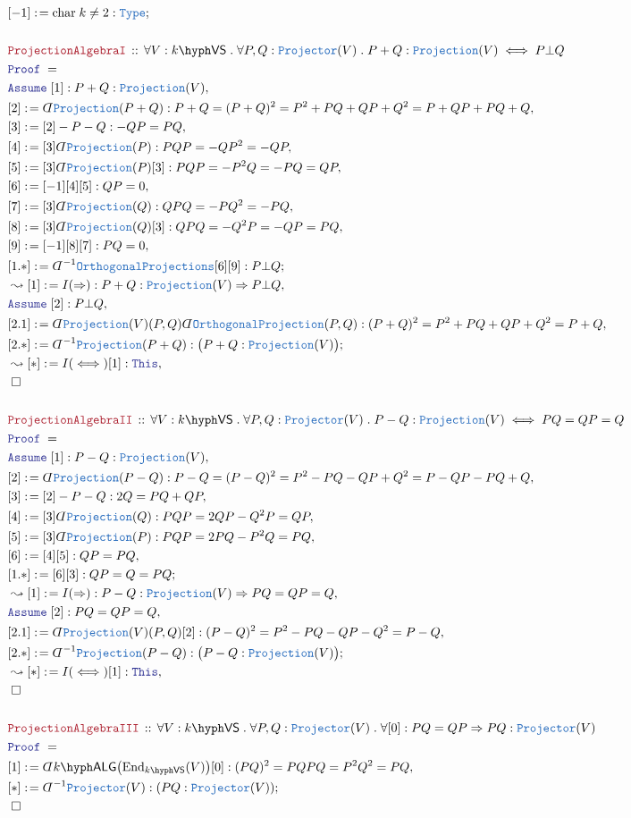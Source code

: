\documentclass[12pt]{scrartcl}%
\newcommand{\TYPE}[1]{\textcolor{NavyBlue}{\mathtt{#1}}}%
\newcommand{\LOGIC}[1]{\textcolor{Blue}{\mathtt{#1}}}%
\newcommand{\THM}[1]{\textcolor{Maroon}{\mathtt{#1}}}%
\renewcommand{\.}{\; . \;} %
\newcommand{\de}{: \kern 0.1pc =} %
\newcommand{\Theorem}[2]{& \THM{#1} \, :: \, #2 \\ & \Proof = \\ } %
\newcommand{\Page}[1]{ \begin{align*} #1 \end{align*}  }%
\newcommand{ \bd }{ \ByDef }%
\newcommand{\Type}{\TYPE{Type}}%
\newcommand{\End}{\mathrm{End}}%
\newcommand{\Say}[3]{& #1 \de #2 : #3, \\} %
\newcommand{\Conclude}[3]{& #1 \de #2 : #3; \\}%
\newcommand{\Derive}[3]{& \leadsto #1 \de #2 : #3, \\} %
\newcommand{\Assume}[2]{& \LOGIC{Assume} \; #1 : #2, \\} %
\newcommand{\QED}{\; \square} %
\newcommand{\EndProof}{& \QED \\} %
\newcommand{\ByDef}{\rotatebox[origin=c]{-180}{$D$}}%
\newcommand{\Proof}{\LOGIC{Proof} \; } %
\newcommand{\VS}[1]{#1\hyph\mathsf{VS}} %
\newcommand{\LALG}[1]{#1\hyph\mathsf{ALG}}%
\begin{document}
\Page{
	\Conclude{[-1]}{\mathrm{char} \; k \neq 2}{\Type}
	\\
	\Theorem{ProjectionAlgebraI}{\forall V : \VS{k} \. \forall P,Q : \TYPE{Projector}(V) \. P + Q : \TYPE{Projection}(V) \iff P \bot Q}
	\Assume{[1]}{P + Q : \TYPE{Projection}(V)}
	\Say{[2]}{\bd \TYPE{Projection}(P + Q)}{ P + Q = (P + Q)^2 = P^2 + PQ + QP + Q^2 = P + QP +PQ + Q}
	\Say{[3]}{ [2] - P - Q}{ -QP = PQ }
	\Say{[4]}{[3]\bd \TYPE{Projection}(P)}{ PQP = - QP^2 = - QP  }
	\Say{[5]}{[3]\bd \TYPE{Projection}(P)[3] }{ PQP = - P^2Q = - PQ = QP }
	\Say{[6]}{[-1][4][5]}{QP = 0}
	\Say{[7]}{[3]\bd \TYPE{Projection}(Q)}{ QPQ = - PQ^2 = - PQ  }
	\Say{[8]}{[3]\bd \TYPE{Projection}(Q)[3] }{ QPQ = - Q^2P = - QP = PQ }
	\Say{[9]}{[-1][8][7]}{PQ = 0}
	\Conclude{[1.*]}{\bd^{-1}\TYPE{OrthogonalProjections}[6][9]}{P \bot Q}
	\Derive{[1]}{I(\Rightarrow)}{P + Q : \TYPE{Projection}(V) \Rightarrow P \bot Q}
	\Assume{[2]}{P \bot Q}
	\Say{[2.1]}{\bd \TYPE{Projection}(V)(P,Q)\bd \TYPE{OrthogonalProjection}(P,Q)}{(P + Q)^2 = P^2 + PQ + QP + Q^2 = P + Q}
	\Conclude{[2.*]}{\bd^{-1}\TYPE{Projection}(P + Q)}{\big( P + Q : \TYPE{Projection}(V)\big)}
	\Derive{[*]}{I(\iff)[1]}{\LOGIC{This}}
	\EndProof
	\\
	\Theorem{ProjectionAlgebraII}{\forall V : \VS{k} \. \forall P,Q : \TYPE{Projector}(V) \. P - Q : \TYPE{Projection}(V) \iff PQ = QP = Q}
	\Assume{[1]}{P - Q : \TYPE{Projection}(V)}
	\Say{[2]}{\bd \TYPE{Projection}(P - Q)}{ P - Q = (P - Q)^2 = P^2 - PQ - QP + Q^2 = P - QP - PQ + Q}
	\Say{[3]}{ [2] - P - Q}{  2Q = PQ + QP }
	\Say{[4]}{[3]\bd \TYPE{Projection}(Q)}{ PQP = 2QP - Q^2P = QP  }
	\Say{[5]}{[3]\bd \TYPE{Projection}(P) }{ PQP = 2PQ - P^2Q = PQ   }
	\Say{[6]}{ [4][5]}{QP = PQ}
	\Conclude{[1.*]}{[6][3]}{QP = Q = PQ}
	\Derive{[1]}{I(\Rightarrow)}{P - Q : \TYPE{Projection}(V) \Rightarrow PQ = QP = Q}
	\Assume{[2]}{PQ = QP = Q}
	\Say{[2.1]}{\bd \TYPE{Projection}(V)(P,Q)[2]}{(P - Q)^2 = P^2 - PQ - QP - Q^2 = P - Q}
	\Conclude{[2.*]}{\bd^{-1}\TYPE{Projection}(P - Q)}{\big( P - Q : \TYPE{Projection}(V)\big)}
	\Derive{[*]}{I(\iff)[1]}{\LOGIC{This}}
	\EndProof
	\\
	\Theorem{ProjectionAlgebraIII}{\forall V : \VS{k} \. \forall P,Q : \TYPE{Projector}(V) \. \forall [0] :  PQ = QP \Rightarrow PQ : \TYPE{Projector}(V)}
	\Say{[1]}{\bd \LALG{k}\big(\End_{\VS{k}}(V)\big)[0]}{(PQ)^2 = PQPQ = P^2Q^2 = PQ}
	\Conclude{[*]}{\bd^{-1}\TYPE{Projector}(V)}{(PQ : \TYPE{Projector}(V))}
	\EndProof
}
\newpage
\end{document}
